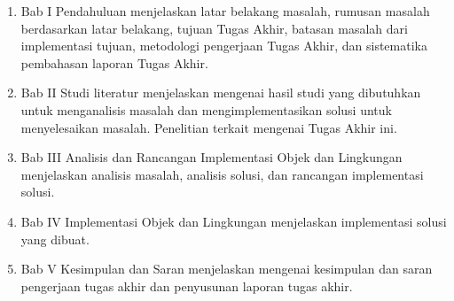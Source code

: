 \begin{enumerate}

    \item Bab I Pendahuluan menjelaskan latar belakang masalah, rumusan masalah
    berdasarkan latar belakang, tujuan Tugas Akhir, batasan masalah dari
    implementasi tujuan, metodologi pengerjaan Tugas Akhir, dan sistematika
    pembahasan laporan Tugas Akhir.

    \item Bab II Studi literatur menjelaskan mengenai hasil studi yang
    dibutuhkan untuk menganalisis masalah dan mengimplementasikan solusi untuk
    menyelesaikan masalah. Penelitian terkait mengenai Tugas Akhir ini.

    \item Bab III Analisis dan Rancangan Implementasi Objek dan Lingkungan
    menjelaskan analisis masalah, analisis solusi, dan rancangan implementasi
    solusi.

    \item Bab IV Implementasi Objek dan Lingkungan menjelaskan implementasi
    solusi yang dibuat.

    \item Bab V Kesimpulan dan Saran menjelaskan mengenai kesimpulan dan saran
    pengerjaan tugas akhir dan penyusunan laporan tugas akhir.

\end{enumerate}
